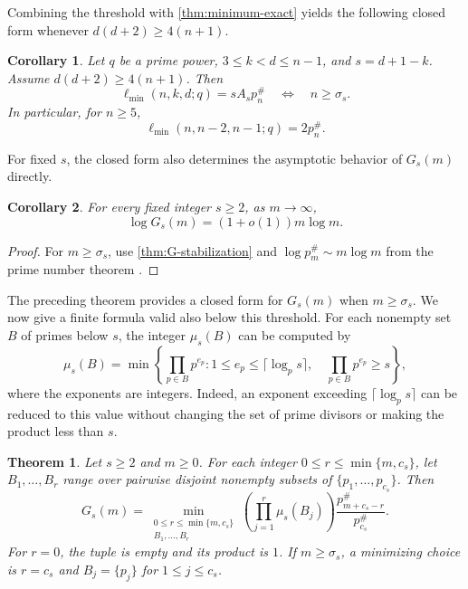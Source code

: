 \documentclass[11pt,onecolumn]{IEEEtran}
\newtheorem{theorem}{Theorem}
\newtheorem{corollary}{Corollary}
\newcommand{\ellmin}{\ell_{\min}}
\newcommand{\primorial}[1]{p_{#1}^{\#}}
\begin{document}
Combining the threshold with \cref{thm:minimum-exact} yields the
following closed form whenever $d(d+2)\geq 4(n+1)$.

\begin{corollary}
\label{cor:closed-minimum}
Let $q$ be a prime power, $3\le k<d\le n-1$, and $s=d+1-k$. Assume $d(d+2)\geq 4(n+1)$. Then
\[
\ellmin(n,k,d;q)=sA_s\primorial{n}
\quad\Longleftrightarrow\quad
n\ge\sigma_s.
\]
In particular, for $n\ge5$,
\[
\ellmin(n,n-2,n-1;q)=2\primorial{n}.
\]
\end{corollary}

For fixed $s$, the closed form also determines the asymptotic behavior of
$G_s(m)$ directly.

\begin{corollary}
\label{cor:G-asymptotic}
For every fixed integer $s\ge2$, as $m\to\infty$,
\[
\log G_s(m)=(1+o(1))m\log m.
\]
\end{corollary}

\begin{proof}
For $m\ge\sigma_s$, use \cref{thm:G-stabilization} and
$\log\primorial{m}\sim m\log m$ from the prime number theorem
\cite{HardyWright2008}.
\end{proof}

The preceding theorem provides a closed form for $G_s(m)$
when $m\ge\sigma_s$. We now give a finite formula valid
also below this threshold. For each nonempty set $B$ of
primes below $s$, the integer $\mu_s(B)$ can be computed by
\[
\mu_s(B)=\min\left\{\prod_{p\in B}p^{e_p}:
  1\le e_p\le\lceil\log_p s\rceil,\quad
  \prod_{p\in B}p^{e_p}\ge s\right\},
\]
where the exponents are integers.  Indeed, an exponent exceeding
$\lceil\log_p s\rceil$ can be reduced to this value without
changing the set of prime divisors or making the product less
than $s$.

\begin{theorem}
\label{thm:G-finite-formula}
Let $s\ge2$ and $m\ge0$.  For each integer
$0\le r\le\min\{m,c_s\}$, let $B_1,\ldots,B_r$ range over
pairwise disjoint nonempty subsets of
$\{p_1,\ldots,p_{c_s}\}$.  Then
\begin{equation}
G_s(m)=
\min_{\substack{0\le r\le\min\{m,c_s\}\\ B_1,\ldots,B_r}}
  \left(\prod_{j=1}^{r}\mu_s(B_j)\right)
  \frac{\primorial{m+c_s-r}}{\primorial{c_s}}.
\label{eq:G-exact-formula}
\end{equation}
For $r=0$, the tuple is empty and its product is $1$.
If $m\ge\sigma_s$, a minimizing choice is $r=c_s$ and
$B_j=\{p_j\}$ for $1\le j\le c_s$.
\end{theorem}
\end{document}
